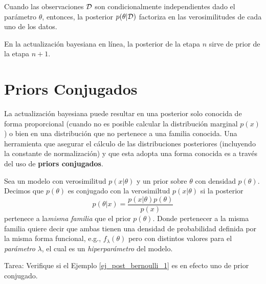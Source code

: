 \begin{remark}
Cuando las observaciones ${\mathcal D}$ son condicionalmente independientes dado el parámetro $\theta$, entonces, la posterior $p(\theta|{\mathcal D})$ factoriza en las verosimilitudes de cada uno de los datos. 
\end{remark}

\begin{remark}
En la actualización bayesiana en línea, la posterior de la etapa $n$ sirve de prior de la etapa $n+1$.
\end{remark}


\section{Priors Conjugados}

La actualización bayesiana puede resultar en una posterior solo conocida de forma proporcional (cuando no es posible calcular la distribución marginal $p(x)$) o bien en una distribución que no pertenece a una familia conocida. Una herramienta que asegurar el cálculo de las distribuciones posteriores (incluyendo la constante de normalización) y que esta adopta una forma conocida es a través del uso de \textbf{priors conjugados}.
\begin{definition}

Sea un modelo con verosimilitud $p(x|\theta)$ y un prior sobre $\theta$ con densidad $p(\theta)$. Decimos que $p(\theta)$ es conjugado con la verosimiltud $p(x|\theta)$ si la posterior 
\begin{equation}
	p(\theta|x) = \frac{p(x|\theta)p(\theta)}{p(x)}
\end{equation}
pertenece a la\textit{misma familia} que el prior $p(\theta)$. Donde pertenecer a la misma familia quiere decir que ambas tienen una densidad de probabilidad definida por la misma forma funcional, e.g., $f_\lambda(\theta)$ pero con distintos valores para el \textit{parámetro} $\lambda$, el cual es un \textit{hiperparámetro} del modelo.
\end{definition}


\begin{example}
\label{ej_post_bernoulli_2}
Tarea: Verifique si el Ejemplo \ref{ej_post_bernoulli_1} es en efecto uno de prior conjugado. 
\end{example}

